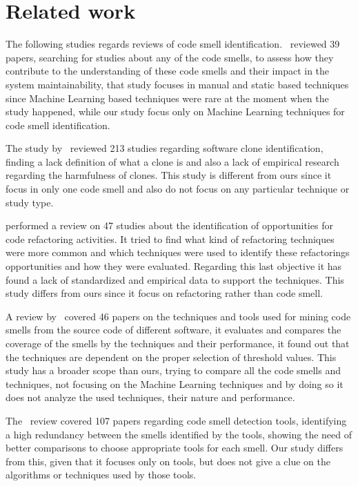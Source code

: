 \section{Related work}

The following studies regards reviews of code smell identification.~\citet{zhang2011code} reviewed 39 papers, searching for studies about any of the code smells, to assess how they contribute to the understanding of these code smells and their impact in the system maintainability, that study focuses in manual and static based techniques since Machine Learning based techniques were rare at the moment when the study happened, while our study focus only on Machine Learning techniques for code smell identification.

The study by~\citet{rattan2013software} reviewed 213 studies regarding software clone identification, finding a lack definition of what a clone is and also a lack of empirical research regarding the harmfulness of clones. This study is different from ours since it focus in only one code smell and also do not focus on any particular technique or study type.

\citet{al2015identifying} performed a review on 47 studies about the identification of opportunities for code refactoring activities. It tried to find what kind of refactoring techniques were more common and which techniques were used to identify these refactorings opportunities and how they were evaluated. Regarding this last objective it has found a lack of standardized and empirical data to support the techniques. This study differs from ours since it focus on refactoring rather than code smell.

A review by~\citet{rasool2015review} covered 46 papers on the techniques and tools used for mining code smells from the source code of different software, it evaluates and compares the coverage of the smells by the techniques and their performance, it found out that the techniques are dependent on the proper selection of threshold values. This study has a broader scope than ours, trying to compare all the code smells and techniques, not focusing on the Machine Learning techniques and by doing so it does not analyze the used techniques, their nature and performance.

The~\citet{fernandes2016review} review covered 107 papers regarding code smell detection tools, identifying a high redundancy between the smells identified by the tools, showing the need of better comparisons to choose appropriate tools for each smell. Our study differs from this, given that it focuses only on tools, but does not give a clue on the algorithms or techniques used by those tools.


